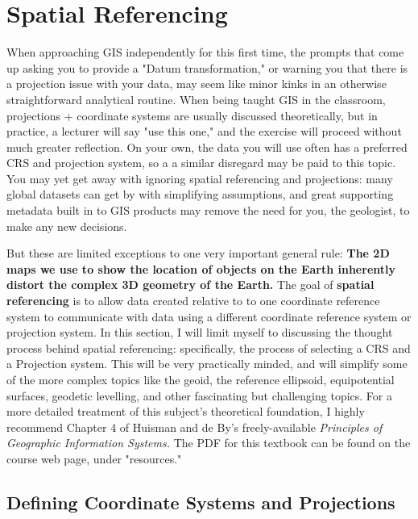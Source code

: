 \documentclass{article}
\begin{document}
\section{Spatial Referencing}

When approaching GIS independently for this first time, the prompts that come up asking you to provide a "Datum transformation," or warning you that there is a projection issue with your data, may seem like minor kinks in an otherwise straightforward analytical routine. When being taught GIS in the classroom, projections + coordinate systems are usually discussed theoretically, but in practice, a lecturer will say "use this one," and the exercise will proceed without much greater reflection. On your own, the data you will use often has a preferred CRS and projection system, so a a similar disregard may be paid to this topic. You may yet get away with ignoring spatial referencing and projections: many global datasets can get by with simplifying assumptions, and great supporting metadata built in to GIS products may remove the need for you, the geologist, to make any new decisions. 

But these are limited exceptions to one very important general rule: \textbf{The 2D maps we use to show the location of objects on the Earth inherently distort the complex 3D geometry of the Earth.} The goal of \textbf{spatial referencing} is to allow data created relative to to one coordinate reference system to communicate with data using a different coordinate reference system or projection system. In this section, I will limit myself to discussing the thought process behind spatial referencing: specifically, the process of selecting a CRS and a Projection system. This will be very practically minded, and will simplify some of the more complex topics like the geoid, the reference ellipsoid, equipotential surfaces, geodetic levelling, and other fascinating but challenging topics.  For a more detailed treatment of this subject's theoretical foundation, I highly recommend Chapter 4 of Huisman and de By's freely-available \textit{Principles of Geographic Information Systems.} The PDF for this textbook can be found on the course web page, under "resources." 

\subsection{Defining Coordinate Systems and Projections}
\end{document}
